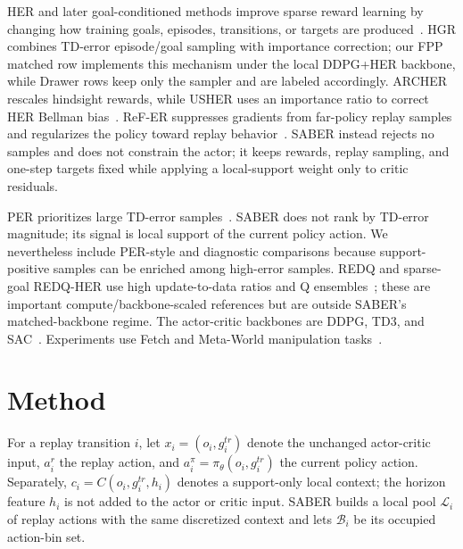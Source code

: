\documentclass[letterpaper]{article}
\begin{document}
HER and later goal-conditioned methods improve sparse reward learning by changing how training goals, episodes, transitions, or targets are produced~\citep{andrychowicz2017her,ren2019hgg,fang2019cher,zhao2018ebp,luu2021hgr,yang2021mher}. HGR combines TD-error episode/goal sampling with importance correction; our FPP matched row implements this mechanism under the local DDPG+HER backbone, while Drawer rows keep only the sampler and are labeled accordingly. ARCHER rescales hindsight rewards, while USHER uses an importance ratio to correct HER Bellman bias~\citep{lanka2018archer,schramm2023usher}. ReF-ER suppresses gradients from far-policy replay samples and regularizes the policy toward replay behavior~\citep{novati2019refer}. SABER instead rejects no samples and does not constrain the actor; it keeps rewards, replay sampling, and one-step targets fixed while applying a local-support weight only to critic residuals.

PER prioritizes large TD-error samples~\citep{schaul2015per}. SABER does not rank by TD-error magnitude; its signal is local support of the current policy action. We nevertheless include PER-style and diagnostic comparisons because support-positive samples can be enriched among high-error samples. REDQ and sparse-goal REDQ-HER use high update-to-data ratios and Q ensembles~\citep{chen2021redq,hiraoka2023sparsegoalredq}; these are important compute/backbone-scaled references but are outside SABER's matched-backbone regime. The actor-critic backbones are DDPG, TD3, and SAC~\citep{lillicrap2015ddpg,fujimoto2018td3,haarnoja2018sac}. Experiments use Fetch and Meta-World manipulation tasks~\citep{plappert2018multigoal,yu2020metaworld}.

\section{Method}

For a replay transition \(i\), let \(x_i=(o_i,g_i^{tr})\) denote the unchanged actor-critic input, \(a_i^r\) the replay action, and \(a_i^\pi=\pi_\theta(o_i,g_i^{tr})\) the current policy action. Separately, \(c_i=C(o_i,g_i^{tr},h_i)\) denotes a support-only local context; the horizon feature \(h_i\) is not added to the actor or critic input. SABER builds a local pool \(\mathcal L_i\) of replay actions with the same discretized context and lets \(\mathcal B_i\) be its occupied action-bin set.
\end{document}
